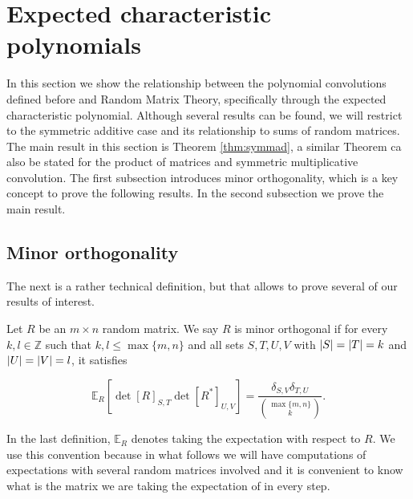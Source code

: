 

\section{Expected characteristic polynomials} \label{sec:minor_orthogonality}

In this section we show the relationship between the polynomial convolutions defined before and Random Matrix Theory, specifically through the expected characteristic polynomial. Although several results can be found, we will restrict to the symmetric additive case and its relationship to sums of random matrices. The main result in this section is Theorem \ref{thm:symmad}, a similar Theorem ca also be stated for the product of matrices and symmetric multiplicative convolution. The first subsection introduces minor orthogonality, which is a key concept to prove the following results. In the second subsection we prove the main result.

\subsection{Minor orthogonality}

The next is a rather technical definition, but that allows to prove several of our results of interest.

\begin{definition}
    Let $R$ be an $m \times n$ random matrix. We say $R$ is minor orthogonal if for every $k,l \in \mathbb Z$ such that $k,l \le \max\{m,n\}$ and all sets $S,T,U,V$ with $\lvert S \rvert = \lvert T \rvert = k$ and $\lvert U \rvert = \lvert V \rvert = l$, it satisfies
    
    \begin{equation*}
        \mathbb E_R\left[ \det[R]_{S,T} \det[R^*]_{U,V} \right] = \frac{\delta_{S,V}\delta_{T,U}}{\binom{\max\{m,n\}}{k}}.
    \end{equation*}
\end{definition}

    In the last definition, $\mathbb E_R$ denotes taking the expectation with respect to $R$. We use this convention because in what follows we will have computations of expectations with several random matrices involved and it is convenient to know what is the matrix we are taking the expectation of in every step.


